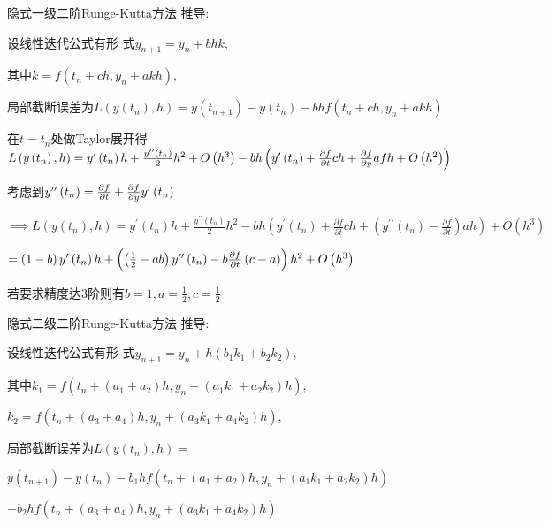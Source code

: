 \documentclass{article}
\begin{document}
隐式一级二阶Runge-Kutta方法%
推导:

设线性迭代公式有形%
式$y_{n+1}=y_{n}+bhk,$

其中$k=f\left( t_{n}+ch,y_{n}+akh\right) ,$

局部截断误差为$L\left( y\left(
t_{n}\right) ,h\right) =y\left( t_{n+1}\right) -y\left( t_{n}\right)
-bhf\left( t_{n}+ch,y_{n}+akh\right) $

在$t=t_{n}$处做Taylor展开得$L\left(
y\left( t_{n}\right) ,h\right) =y^{\prime }\left( t_{n}\right) h+\frac{%
y^{\prime \prime }\left( t_{n}\right) }{2}h^{2}+O\left( h^{3}\right)
-bh\left( y^{\prime }\left( t_{n}\right) +\frac{\partial f}{\partial t}ch+%
\frac{\partial f}{\partial y}afh+O\left( h^{2}\right) \right) $

考虑到$y^{\prime \prime }\left( t_{n}\right) =\frac{%
\partial f}{\partial t}+\frac{\partial f}{\partial y}y^{\prime }\left(
t_{n}\right) $

$\implies L\left( y\left( t_{n}\right) ,h\right) =y^{\prime }\left(
t_{n}\right) h+\frac{y^{\prime \prime }\left( t_{n}\right) }{2}%
h^{2}-bh\left( y^{\prime }\left( t_{n}\right) +\frac{\partial f}{\partial t}%
ch+\left( y^{\prime \prime }\left( t_{n}\right) -\frac{\partial f}{\partial t%
}\right) ah\right) +O\left( h^{3}\right) $

$=\left( 1-b\right) y^{\prime }\left( t_{n}\right) h+\left( \left( \frac{1}{2%
}-ab\right) y^{\prime \prime }\left( t_{n}\right) -b\frac{\partial f}{%
\partial t}\left( c-a\right) \right) h^{2}+O\left( h^{3}\right) $

若要求精度达3阶则有$%
b=1,a=\frac{1}{2},c=\frac{1}{2}$

\bigskip 

隐式二级二阶Runge-Kutta方法%
推导:

设线性迭代公式有形%
式$y_{n+1}=y_{n}+h\left( b_{1}k_{1}+b_{2}k_{2}\right) ,$

其中$k_{1}=f\left( t_{n}+\left( a_{1}+a_{2}\right)
h,y_{n}+\left( a_{1}k_{1}+a_{2}k_{2}\right) h\right) ,$

$k_{2}=f\left( t_{n}+\left( a_{3}+a_{4}\right) h,y_{n}+\left(
a_{3}k_{1}+a_{4}k_{2}\right) h\right) ,$

局部截断误差为$L\left( y\left(
t_{n}\right) ,h\right) =$

$y\left( t_{n+1}\right) -y\left( t_{n}\right) -b_{1}hf\left( t_{n}+\left(
a_{1}+a_{2}\right) h,y_{n}+\left( a_{1}k_{1}+a_{2}k_{2}\right) h\right) $

$-b_{2}hf\left( t_{n}+\left( a_{3}+a_{4}\right) h,y_{n}+\left(
a_{3}k_{1}+a_{4}k_{2}\right) h\right) $
\end{document}

